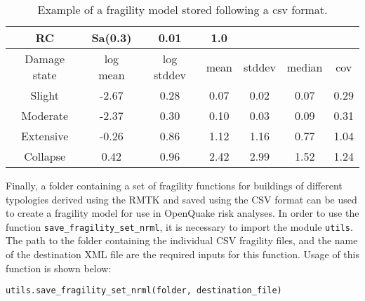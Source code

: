 \begin {table}[htb]
\caption{Example of a fragility model stored following a csv format.}
\label{table:ff_csv}
\begin{center}
  \begin{tabular}{ | c | c | c | c | c | c | c |}
  \hline
RC & Sa(0.3) & 0.01 & 1.0 &  &  &  \\ \hline
Damage state & log mean & log stddev & mean & stddev & median & cov \\ \hline
Slight & -2.67 & 0.28 & 0.07 & 0.02 & 0.07 & 0.29 \\ \hline
Moderate & -2.37 & 0.30 & 0.10 & 0.03 & 0.09 & 0.31 \\ \hline
Extensive & -0.26 & 0.86 & 1.12 & 1.16 & 0.77 & 1.04 \\ \hline
Collapse & 0.42 & 0.96 & 2.42 & 2.99 & 1.52 & 1.24 \\ \hline
  \end{tabular}
\end{center}
\end{table}

Finally, a folder containing a set of fragility functions for buildings of different typologies derived using the RMTK and saved using the CSV format can be used to create a fragility model for use in OpenQuake risk analyses. In order to use the function \verb=save_fragility_set_nrml=, it is necessary to import the module \verb=utils=. The path to the folder containing the individual CSV fragility files, and the name of the destination XML file are the required inputs for this function. Usage of this function is shown below:

\begin{Verbatim}[frame=single, commandchars=\\\{\}, samepage=true]
utils.save_fragility_set_nrml(folder, destination_file)
\end{Verbatim}